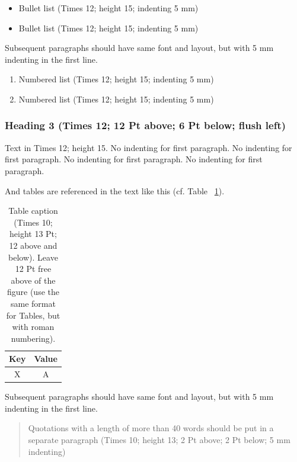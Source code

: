 \documentclass{CML_Seminar_Template}
\begin{document}
\begin{itemize}
\item Bullet list (Times 12; height 15; indenting 5 mm) 
\item Bullet list (Times 12; height 15; indenting 5 mm) 
\end{itemize}

Subsequent paragraphs should have same font and layout, but with 5 mm indenting in the first line. 

\begin{enumerate}
\item Numbered list (Times 12; height 15; indenting 5 mm)
\item Numbered list (Times 12; height 15; indenting 5 mm)
\end{enumerate}
 
\subsubsection{Heading 3 (Times 12; 12 Pt above; 6 Pt below; flush left)}

Text in Times 12; height 15. No indenting for first paragraph. No indenting for first paragraph. No indenting for first paragraph. No indenting for first paragraph. 

And tables are referenced in the text like this (cf. Table ~\ref{CML_Seminar_Template_tab1}).

\begin{table}
\begin{center}
\begin{tabular}{ |c|c|} 
 \hline
 Key & Value \\
 \hline
 X & A \\
 \hline
\end{tabular}
\end{center}
    \caption{\label{CML_Seminar_Template_tab1} Table caption (Times 10; height 13 Pt; 12 above and below). Leave 12 Pt free above of the figure (use the same format for Tables, but with roman numbering). }
\end{table}

Subsequent paragraphs should have same font and layout, but with 5 mm indenting in the first line. 

\begin{quote}
Quotations with a length of more than 40 words should be put in a separate paragraph (Times 10; height 13; 2 Pt above; 2 Pt below; 5 mm indenting)
\end{quote}
\end{document}

